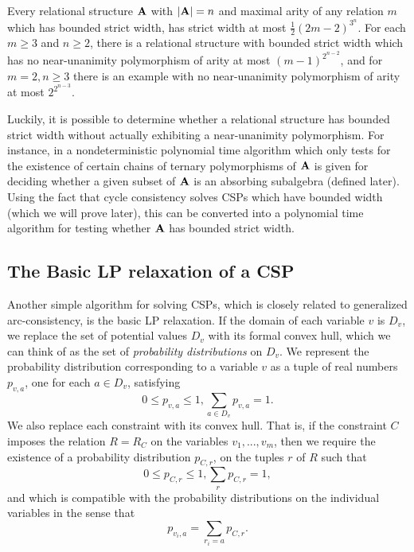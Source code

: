 \documentclass[letterpaper,11pt]{article}
\begin{document}
\begin{thm} Every relational structure $\mathbf{A}$ with $|\mathbf{A}| = n$ and maximal arity of any relation $m$ which has bounded strict width, has strict width at most $\frac{1}{2}(2m-2)^{3^n}$. For each $m \ge 3$ and $n \ge 2$, there is a relational structure with bounded strict width which has no near-unanimity polymorphism of arity at most $(m-1)^{2^{n-2}}$, and for $m = 2, n \ge 3$ there is an example with no near-unanimity polymorphism of arity at most $2^{2^{n-3}}$.
\end{thm}

Luckily, it is possible to determine whether a relational structure has bounded strict width without actually exhibiting a near-unanimity polymorphism. For instance, in \cite{deciding-absorption-relational} a nondeterministic polynomial time algorithm which only tests for the existence of certain chains of ternary polymorphisms of $\mathbf{A}$ is given for deciding whether a given subset of $\mathbf{A}$ is an absorbing subalgebra (defined later). Using the fact that cycle consistency solves CSPs which have bounded width (which we will prove later), this can be converted into a polynomial time algorithm for testing whether $\mathbf{A}$ has bounded strict width.


\subsection{The Basic LP relaxation of a CSP}\label{subsection-lp}

Another simple algorithm for solving CSPs, which is closely related to generalized arc-consistency, is the basic LP relaxation. If the domain of each variable $v$ is $D_v$, we replace the set of potential values $D_v$ with its formal convex hull, which we can think of as the set of \emph{probability distributions} on $D_v$. We represent the probability distribution corresponding to a variable $v$ as a tuple of real numbers $p_{v,a}$, one for each $a \in D_v$, satisfying
\[
0 \le p_{v,a} \le 1, \sum_{a \in D_v} p_{v,a} = 1.
\]
We also replace each constraint with its convex hull. That is, if the constraint $C$ imposes the relation $R = R_C$ on the variables $v_1, ..., v_m$, then we require the existence of a probability distribution $p_{C,r}$, on the tuples $r$ of $R$ such that
\[
0 \le p_{C,r} \le 1, \sum_r p_{C,r} = 1,
\]
and which is compatible with the probability distributions on the individual variables in the sense that
\[
p_{v_i,a} = \sum_{r_i = a} p_{C,r}.
\]
\end{document}
